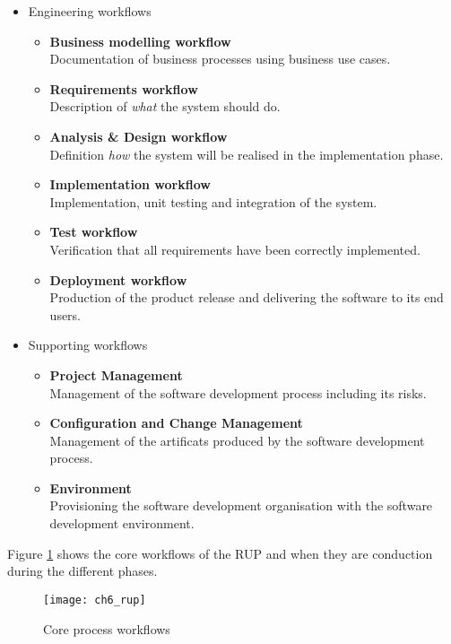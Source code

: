 \begin{itemize}
	\item Engineering workflows
	\begin{itemize}
		\item \textbf{Business modelling workflow}\\
		Documentation of business processes using business use cases.
		\item \textbf{Requirements workflow}\\
		Description of \emph{what} the system should do.
		\item \textbf{Analysis \& Design workflow}\\
		Definition \emph{how} the system  will be realised in the implementation phase.
		\item \textbf{Implementation workflow}\\
		Implementation, unit testing and integration of the system.
		\item \textbf{Test workflow}\\
		Verification that all requirements have been correctly implemented.
		\item \textbf{Deployment workflow}\\
		Production of the product release and delivering the software to its end users.
	\end{itemize}
	\item Supporting workflows
	\begin{itemize}
		\item \textbf{Project Management}\\
		Management of the software development process including its risks.
		\item \textbf{Configuration and Change Management}\\
		Management of the artificats produced by the software development process.
		\item \textbf{Environment}\\
		Provisioning the software development organisation with the software development environment.
	\end{itemize}
\end{itemize}

Figure \ref{fig:ch6_rup} shows the core workflows of the \ac{RUP} and when they are conduction during the different phases.

\begin{figure}[htpb] \centering 
	\texttt{[image: ch6\_rup]} 
	\caption{Core process workflows \citep{Kruchten:1996aa}} 
	\label{fig:ch6_rup} 
\end{figure}

